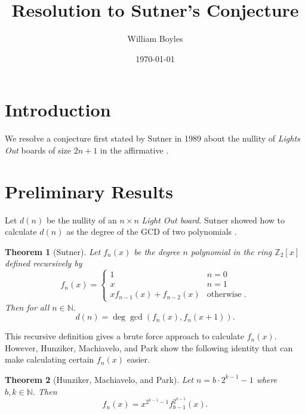 \documentclass[a4paper]{article}
\newtheorem{theorem}{Theorem}
\newcommand{\Z}{\mathbb{Z}}
\newcommand{\N}{\mathbb{N}}
\begin{document}
	\title{Resolution to Sutner's Conjecture}
	\author{William Boyles}
	\date{\today}
	\maketitle
	
	\section{Introduction}
	We resolve a conjecture first stated by Sutner in 1989 about the nullity of \textit{Lights Out} boards of size $2n + 1$ in the affirmative \cite{Sutner1989}.
	
	\section{Preliminary Results}
	Let $d(n)$ be the nullity of an $n \times n$ \textit{Light Out board}.
	Sutner showed how to calculate $d(n)$ as the degree of the GCD of two polynomials \cite{Sutner96sigma-automataand}.
	
	\begin{theorem}[Sutner]\label{Sutner_gcd}
		Let $f_n(x)$ be the degree $n$ polynomial in the ring $\Z_2[x]$ defined recursively by
		\begin{equation*}
			f_n(x) = \begin{cases}
				1 & n=0 \\
				x & n=1 \\
				xf_{n-1}(x) + f_{n-2}(x) & \text{otherwise }.
			\end{cases}
		\end{equation*}
		Then for all $n \in \N$.
		\begin{equation*}
			d(n) = \deg{\gcd\left(f_{n}(x), f_{n}(x+1)\right)}.
		\end{equation*}
	\end{theorem}

	This recursive definition gives a brute force approach to calculate $f_n(x)$.
	However, Hunziker, Machiavelo, and Park show the following identity that can make calculating certain $f_n(x)$ easier.
	
	\begin{theorem}[Hunziker, Machiavelo, and Park]\label{HMP_identity}
		Let $n = b\cdot2^{k-1} - 1$ where $b, k \in \N$.
		Then
		\begin{equation*}
			f_n(x) = x^{2^{k-1}-1} f_{b-1}^{2^{k-1}}(x).
		\end{equation*}
	\end{theorem}
\end{document}
